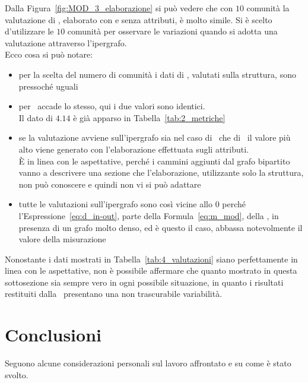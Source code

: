 %
Dalla Figura~\ref{fig:MOD_3_elaborazione} si può vedere che con $10$ comunità la valutazione di \cora, elaborato con e senza attributi, è molto simile. Si è scelto d'utilizzare le $10$ comunità per osservare le variazioni quando si adotta una valutazione attraverso l'ipergrafo.\\
Ecco cosa si può notare:
\begin{itemize}
	\item per la scelta del numero di comunità i dati di \cora, valutati sulla struttura, sono pressoché uguali
	\item per \citeseer\ accade lo stesso, qui i due valori sono identici.\\
	Il dato di $4.14$  è già apparso in Tabella~\ref{tab:2_metriche}
	\item se la valutazione avviene sull'ipergrafo sia nel caso di \cora\ che di \citeseer\ il valore più alto viene generato con l'elaborazione effettuata sugli attributi.\\
	È in linea con le aspettative, perché i cammini aggiunti dal grafo bipartito vanno a descrivere una sezione che l'elaborazione, utilizzante solo la struttura, non può conoscere e quindi non vi si può adattare
	\item tutte le valutazioni sull'ipergrafo sono così vicine allo $0$ perché l'Espressione~\ref{eq:d_in-out}, parte della Formula~\ref{eq:m_mod}, della \mmod, in presenza di un grafo molto denso, ed è questo il caso, abbassa notevolmente il valore della misurazione
\end{itemize}
%
Nonostante i dati mostrati in Tabella~\ref{tab:4_valutazioni} siano perfettamente in linea con le aspettative, non è possibile affermare che quanto mostrato in questa sottosezione sia sempre vero in ogni possibile situazione, in quanto i risultati restituiti dalla \mmod\ presentano una non trascurabile variabilità.



\chapter{Conclusioni}\label{chap:4}
Seguono alcune considerazioni personali sul lavoro affrontato e su come è stato svolto.
